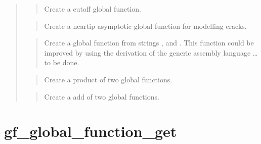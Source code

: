 \documentclass[a4paper,11pt,english]{sphinxmanual}
\begin{document}
\sphinxAtStartPar
{}
\begin{quote}

\sphinxAtStartPar
{}
\begin{quote}

\sphinxAtStartPar
Create a cutoff global function.
\end{quote}

\sphinxAtStartPar
{}
\begin{quote}

\sphinxAtStartPar
Create a near\sphinxhyphen{}tip asymptotic global function for modelling cracks.
\end{quote}

\sphinxAtStartPar
{}
\begin{quote}

\sphinxAtStartPar
Create a global function from strings ,  and .
This function could be improved by using the derivation of the generic
assembly language … to be done.
\end{quote}

\sphinxAtStartPar
{}
\begin{quote}

\sphinxAtStartPar
Create a product of two global functions.
\end{quote}

\sphinxAtStartPar
{}
\begin{quote}

\sphinxAtStartPar
Create a add of two global functions.
\end{quote}
\end{quote}


\section{gf\_global\_function\_get}
\label{\detokenize{matlab_octave/cmdref_gf_global_function_get:gf-global-function-get}}\label{\detokenize{matlab_octave/cmdref_gf_global_function_get::doc}}
\sphinxAtStartPar
{}
\end{document}
